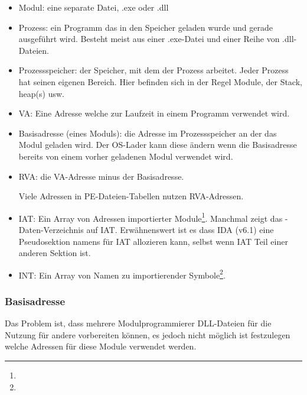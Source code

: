 \begin{itemize}
\item Modul: eine separate Datei, .exe oder .dll

\item Prozess: ein Programm das in den Speicher geladen wurde und gerade ausgeführt
wird. Besteht meist aus einer .exe-Datei und einer Reihe von .dll-Dateien.

\item Prozessspeicher: der Speicher, mit dem der Prozess arbeitet. Jeder Prozess
hat seinen eigenen Bereich. Hier befinden sich in der Regel Module, der Stack,
\gls{heap}(s) usw.

\item \ac{VA}: Eine Adresse welche zur Laufzeit in einem Programm verwendet wird.

\item Basisadresse (eines Moduls): die Adresse im Prozessspeicher an der das Modul
geladen wird. Der \ac{OS}-Lader kann diese ändern wenn die Basisadresse bereits
von einem vorher geladenen Modul verwendet wird.

\item \ac{RVA}: die \ac{VA}-Adresse minus der Basisadresse.

Viele Adressen in PE-Dateien-Tabellen nutzen \ac{RVA}-Adressen.


\item \ac{IAT}: Ein Array von Adressen importierter Module\footnote{\PietrekPE}.
Manchmal zeigt das -Daten-Verzeichnis auf \ac{IAT}.
\label{IDA_idata}
Erwähnenswert ist es dass \ac{IDA} (v6.1) eine Pseudosektion namens 
für \ac{IAT} allozieren kann, selbst wenn \ac{IAT} Teil einer anderen Sektion ist.

\item \ac{INT}: Ein Array von Namen zu importierender Symbole\footnote{\PietrekPE}.
\end{itemize}

\subsubsection{Basisadresse}

Das Problem ist, dass mehrere Modulprogrammierer DLL-Dateien für die Nutzung für andere
vorbereiten können, es jedoch nicht möglich ist festzulegen welche Adressen für diese
Module verwendet werden.

